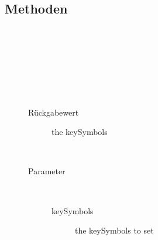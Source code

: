 \subsection{Methoden}
\begin{description}
\item[{\label{ontologyFramework.OFDataMapping.ReservatedDataType.EventComputeLowMapper.getNameFromOntology(java.lang.String,ontologyFramework.OFContextManagement.OWLReferences)}}]
~ 
\item[{\label{ontologyFramework.OFDataMapping.ReservatedDataType.EventComputeLowMapper.getNameFromOntology(org.semanticweb.owlapi.model.OWLNamedIndividual,ontologyFramework.OFContextManagement.OWLReferences)}}]
~ 
\item[{\label{ontologyFramework.OFDataMapping.ReservatedDataType.EventComputeLowMapper.getVariablesName(java.lang.String)}}]
~ 
\item[{\label{ontologyFramework.OFDataMapping.ReservatedDataType.EventComputeLowMapper.getKeySymbols()}}]
~ 
\begin{description}
\item[Rückgabewert] 
the keySymbols
\end{description}
\item[{\label{ontologyFramework.OFDataMapping.ReservatedDataType.EventComputeLowMapper.setKeySymbols(java.util.Set<java.lang.String>)}}]
~ 
\begin{description}
\item[Parameter] ~
\begin{description}
\item[keySymbols]
the keySymbols to set
\end{description}
\end{description}
\end{description}
